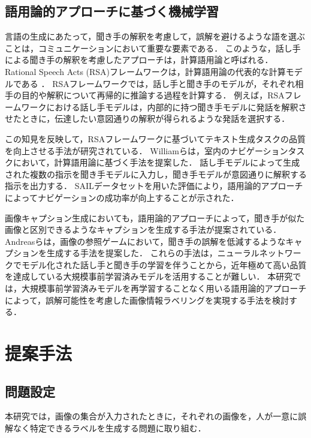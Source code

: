 \documentclass[a4paper,11pt]{jreport}
\begin{document}
\section{語用論的アプローチに基づく機械学習}
\label{sec:relwork_pragmatic_ml}
言語の生成にあたって，聞き手の解釈を考慮して，誤解を避けるような語を選ぶことは，コミュニケーションにおいて重要な要素である．
このような，話し手による聞き手の解釈を考慮したアプローチは，計算語用論と呼ばれる\cite{Fried2023}．
Rational Speech Acts (RSA)フレームワークは，計算語用論の代表的な計算モデルである \cite{Frank2012,Goodman2016}．
RSAフレームワークでは，話し手と聞き手のモデルが，それぞれ相手の目的や解釈について再帰的に推論する過程を計算する．
例えば，RSAフレームワークにおける話し手モデルは，内部的に持つ聞き手モデルに発話を解釈させたときに，伝達したい意図通りの解釈が得られるような発話を選択する．

この知見を反映して，RSAフレームワークに基づいてテキスト生成タスクの品質を向上させる手法が研究されている\cite{Fried2017}．
Williamら\cite{Williams2015}は，室内のナビゲーションタスクにおいて，計算語用論に基づく手法を提案した．
話し手モデルによって生成された複数の指示を聞き手モデルに入力し，聞き手モデルが意図通りに解釈する指示を出力する．
SAILデータセットを用いた評価により，語用論的アプローチによってナビゲーションの成功率が向上することが示された．

画像キャプション生成においても，語用論的アプローチによって，聞き手が似た画像と区別できるようなキャプションを生成する手法が提案されている\cite{Vedantam2017,Cohn-Gordon2018,Nie2020}．
Andreasら\cite{Andreas2016}は，画像の参照ゲームにおいて，聞き手の誤解を低減するようなキャプションを生成する手法を提案した．
これらの手法は，ニューラルネットワークでモデル化された話し手と聞き手の学習を伴うことから，近年極めて高い品質を達成している大規模事前学習済みモデルを活用することが難しい．
本研究では，大規模事前学習済みモデルを再学習することなく用いる語用論的アプローチによって，誤解可能性を考慮した画像情報ラベリングを実現する手法を検討する．

\chapter{提案手法}

\section{問題設定}

本研究では，画像の集合が入力されたときに，それぞれの画像を，人が一意に誤解なく特定できるラベルを生成する問題に取り組む．
\end{document}
